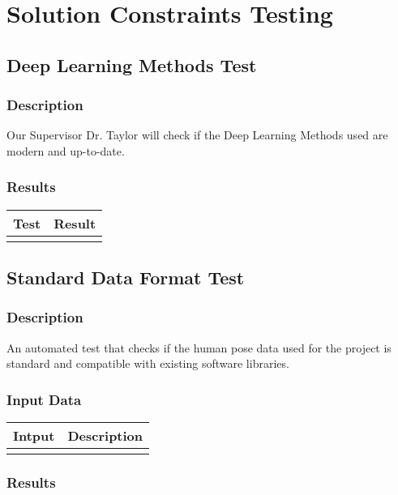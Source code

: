 \documentclass{scrreprt}
\begin{document}
\section{Solution Constraints Testing}

\subsection{Deep Learning Methods Test}
\subsubsection{Description}
Our Supervisor Dr. Taylor will check if the Deep Learning Methods used are modern and up-to-date.
\subsubsection{Results}
 \centering
 \begin{tabular}{||p{2.5cm}|p{2.5cm}||}
 \hline
 \bf Test & \bf Result\\
 \hline\hline
   &  \\ %
 \hline
 \end{tabular}

\subsection{Standard Data Format Test}
\subsubsection{Description}
An automated test that checks if the human pose data used for the project is standard and compatible with existing software libraries.
\subsubsection{Input Data}
 \centering
 \begin{tabular}{p{3cm}p{6cm}}
 \hline\hline
 Intput & Description\\
 \hline\hline
   &  \\ %
 \hline
 \end{tabular}
\subsubsection{Results}
\end{document}
